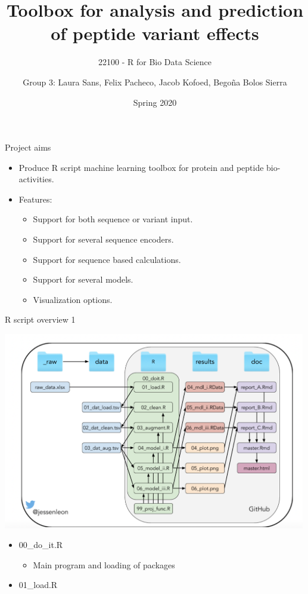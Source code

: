 \documentclass[ignorenonframetext,]{beamer}
\title{Toolbox for analysis and prediction of peptide variant effects}
\subtitle{22100 - R for Bio Data Science}
\author{Group 3: Laura Sans, Felix Pacheco, Jacob Kofoed, Begoña Bolos Sierra}
\date{Spring 2020}
\providecommand{\tightlist}{%
  \setlength{\itemsep}{0pt}\setlength{\parskip}{0pt}}
\begin{document}
\frame{\titlepage}

\begin{frame}

\begin{block}{Project aims}

\begin{itemize}
\tightlist
\item
  Produce R script machine learning toolbox for protein and peptide
  bio-activities.
\item
  Features:

  \begin{itemize}
  \tightlist
  \item
    Support for both sequence or variant input.
  \item
    Support for several sequence encoders.
  \item
    Support for sequence based calculations.
  \item
    Support for several models.
  \item
    Visualization options.
  \end{itemize}
\end{itemize}

\end{block}

\begin{block}{R script overview 1}

\includegraphics[width=5.20833in,height=\textheight]{project_organisation.png}

\begin{itemize}
\tightlist
\item
  00\_do\_it.R

  \begin{itemize}
  \tightlist
  \item
    Main program and loading of packages
  \end{itemize}
\item
  01\_load.R


\end{itemize}
\end{block}
\end{frame}
\end{document}

